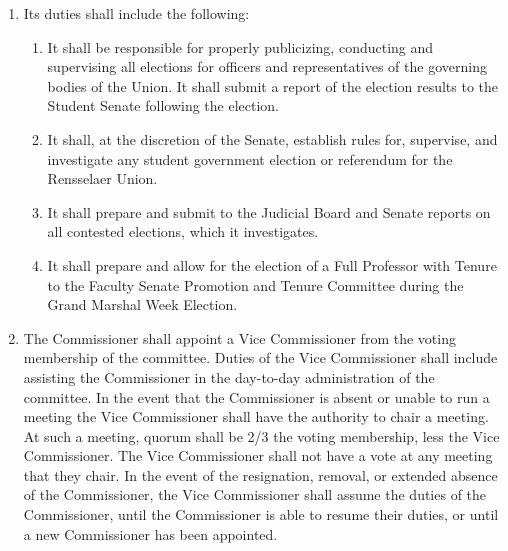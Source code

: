 \begin{enumerate}
\begin{enumerate}
\begin{enumerate}
    \item All members must be Activity Fee paying students. All members, with the exception of the chair, shall serve through the end of the spring semester, until replaced, or until resigned, whichever comes first. The chair shall serve until they resign or are replaced.
    \item Quorum for the Elections Commission shall be 2/3 of the total membership.
    \item A member of the Elections Commission who is a candidate for Grand Marshal, President of the Union or joins a political party or is a candidate assistant, as defined by the Student Senate or the Elections Commission, will automatically be removed from the Elections Commission.
    \end{enumerate}
  \item Its duties shall include the following:
    \begin{enumerate}
    \item It shall be responsible for properly publicizing, conducting and supervising all elections for officers and representatives of the governing bodies of the Union. It shall submit a report of the election results to the Student Senate following the election.
    \item It shall, at the discretion of the Senate, establish rules for, supervise, and investigate any student government election or referendum for the Rensselaer Union.
    \item It shall prepare and submit to the Judicial Board and Senate reports on all contested elections, which it investigates.
    \item It shall prepare and allow for the election of a Full Professor with Tenure to the Faculty Senate Promotion and Tenure Committee during the Grand Marshal Week Election.
    \end{enumerate}
  \item The Commissioner shall appoint a Vice Commissioner from the voting membership of the committee. Duties of the Vice Commissioner shall include assisting the Commissioner in the day-to-day administration of the committee. In the event that the Commissioner is absent or unable to run a meeting the Vice Commissioner shall have the authority to chair a meeting. At such a meeting, quorum shall be 2/3 the voting membership, less the Vice Commissioner. The Vice Commissioner shall not have a vote at any meeting that they chair. In the event of the resignation, removal, or extended absence of the Commissioner, the Vice Commissioner shall assume the duties of the Commissioner, until the Commissioner is able to resume their duties, or until a new Commissioner has been appointed.

\end{enumerate}
\end{enumerate}
